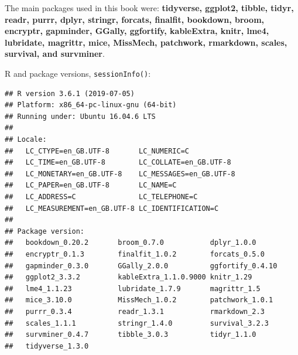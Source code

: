 \documentclass[
  12pt,
  krantz2]{krantz}
\begin{document}
The main packages used in this book were: \textbf{tidyverse, ggplot2, tibble, tidyr, readr, purrr, dplyr, stringr, forcats, finalfit, bookdown, broom, encryptr, gapminder, GGally, ggfortify, kableExtra, knitr, lme4, lubridate, magrittr, mice, MissMech, patchwork, rmarkdown, scales, survival, and survminer}.

R and package versions, \texttt{sessionInfo()}:

\begin{verbatim}
## R version 3.6.1 (2019-07-05)
## Platform: x86_64-pc-linux-gnu (64-bit)
## Running under: Ubuntu 16.04.6 LTS
## 
## Locale:
##   LC_CTYPE=en_GB.UTF-8       LC_NUMERIC=C              
##   LC_TIME=en_GB.UTF-8        LC_COLLATE=en_GB.UTF-8    
##   LC_MONETARY=en_GB.UTF-8    LC_MESSAGES=en_GB.UTF-8   
##   LC_PAPER=en_GB.UTF-8       LC_NAME=C                 
##   LC_ADDRESS=C               LC_TELEPHONE=C            
##   LC_MEASUREMENT=en_GB.UTF-8 LC_IDENTIFICATION=C       
## 
## Package version:
##   bookdown_0.20.2       broom_0.7.0           dplyr_1.0.0          
##   encryptr_0.1.3        finalfit_1.0.2        forcats_0.5.0        
##   gapminder_0.3.0       GGally_2.0.0          ggfortify_0.4.10     
##   ggplot2_3.3.2         kableExtra_1.1.0.9000 knitr_1.29           
##   lme4_1.1.23           lubridate_1.7.9       magrittr_1.5         
##   mice_3.10.0           MissMech_1.0.2        patchwork_1.0.1      
##   purrr_0.3.4           readr_1.3.1           rmarkdown_2.3        
##   scales_1.1.1          stringr_1.4.0         survival_3.2.3       
##   survminer_0.4.7       tibble_3.0.3          tidyr_1.1.0          
##   tidyverse_1.3.0
\end{verbatim}

  

\backmatter
\printindex
\end{document}
